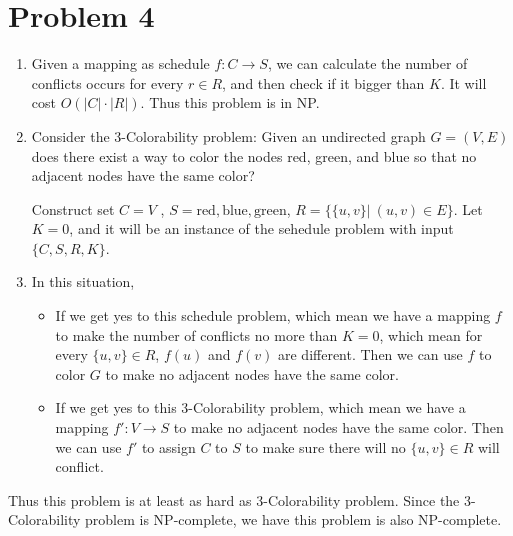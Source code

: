\documentclass{article}
\begin{document}
\section*{Problem 4}
\begin{enumerate}[1)]
    \item Given a mapping as schedule $f: C\rightarrow S$,
    we can calculate the number of conflicts occurs for every $r\in R$,
    and then check if it bigger than $K$.
    It will cost $O(|C|\cdot |R|)$.
    Thus this problem is in NP.
    \item Consider the 3-Colorability problem: Given an undirected graph $G=(V,E)$ does there exist a way to color the nodes red, green, and blue so that no adjacent nodes have the same color?
    
    Construct set $C=V$ , $S={\text{red}, \text{blue}, \text{green}}$, 
    $R=\{\{u,v\}|~(u,v)\in E\} $.
    Let $K=0$, and it will be an instance of the sehedule problem with input $\{C,S,R,K\}$.
    \item In this situation, 
    \begin{itemize}
        \item If we get yes to this schedule problem, which mean we have a mapping $f$ to make the number of conflicts no more than $K=0$, 
        which mean for every $\{u,v\}\in R$, $f(u)$ and $f(v)$ are different.
        Then we can use $f$ to color $G$ to make no adjacent nodes have the same
        color.
        \item If we get yes to this 3-Colorability problem, which mean we have a mapping $f': V\rightarrow S$ to make no adjacent nodes have the same color. 
        Then we can use $f'$ to assign $C$ to $S$ to make sure there will no $\{u,v\}\in R$ will conflict.
    \end{itemize}
\end{enumerate}

Thus this problem is at least as hard as 3-Colorability problem.
Since the 3-Colorability problem is NP-complete, 
we have this problem is also NP-complete.


\pagebreak
\end{document}

